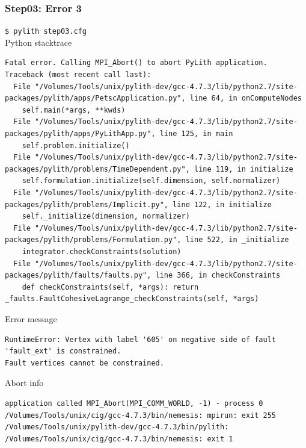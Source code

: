 \documentclass[aspectration=169]{beamer}
\newcommand{\cmd}[1]{{\footnotesize\tt \color{ltred}#1}}
\newcommand{\errlabel}[1]{{\small \color{blue}#1}}
\begin{document}
\begin{frame}[fragile]
  \frametitle{Step03: Error 3}

\cmd{\$ pylith step03.cfg}\\
\errlabel{Python stacktrace}
\begin{lstlisting}
Fatal error. Calling MPI_Abort() to abort PyLith application.
Traceback (most recent call last):
  File "/Volumes/Tools/unix/pylith-dev/gcc-4.7.3/lib/python2.7/site-packages/pylith/apps/PetscApplication.py", line 64, in onComputeNodes
    self.main(*args, **kwds)
  File "/Volumes/Tools/unix/pylith-dev/gcc-4.7.3/lib/python2.7/site-packages/pylith/apps/PyLithApp.py", line 125, in main
    self.problem.initialize()
  File "/Volumes/Tools/unix/pylith-dev/gcc-4.7.3/lib/python2.7/site-packages/pylith/problems/TimeDependent.py", line 119, in initialize
    self.formulation.initialize(self.dimension, self.normalizer)
  File "/Volumes/Tools/unix/pylith-dev/gcc-4.7.3/lib/python2.7/site-packages/pylith/problems/Implicit.py", line 122, in initialize
    self._initialize(dimension, normalizer)
  File "/Volumes/Tools/unix/pylith-dev/gcc-4.7.3/lib/python2.7/site-packages/pylith/problems/Formulation.py", line 522, in _initialize
    integrator.checkConstraints(solution)
  File "/Volumes/Tools/unix/pylith-dev/gcc-4.7.3/lib/python2.7/site-packages/pylith/faults/faults.py", line 366, in checkConstraints
    def checkConstraints(self, *args): return _faults.FaultCohesiveLagrange_checkConstraints(self, *args)
\end{lstlisting}
\errlabel{Error message}
\begin{lstlisting}
RuntimeError: Vertex with label '605' on negative side of fault 'fault_ext' is constrained.
Fault vertices cannot be constrained.
\end{lstlisting}
\errlabel{Abort info}
\begin{lstlisting}
application called MPI_Abort(MPI_COMM_WORLD, -1) - process 0
/Volumes/Tools/unix/cig/gcc-4.7.3/bin/nemesis: mpirun: exit 255
/Volumes/Tools/unix/pylith-dev/gcc-4.7.3/bin/pylith:
/Volumes/Tools/unix/cig/gcc-4.7.3/bin/nemesis: exit 1
\end{lstlisting}

\end{frame}
\end{document}
